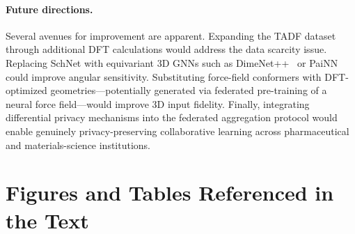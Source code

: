 \documentclass[twocolumn]{article}
\begin{document}
\paragraph{Future directions.}
Several avenues for improvement are apparent.
Expanding the TADF dataset through additional DFT calculations would address the data scarcity issue.
Replacing SchNet with equivariant 3D GNNs such as DimeNet++~\cite{Gasteiger2020_DimeNet} or PaiNN~\cite{Schutt2021_PaiNN} could improve angular sensitivity.
Substituting force-field conformers with DFT-optimized geometries---potentially generated via federated pre-training of a neural force field---would improve 3D input fidelity.
Finally, integrating differential privacy mechanisms into the federated aggregation protocol would enable genuinely privacy-preserving collaborative learning across pharmaceutical and materials-science institutions.








\clearpage
\appendix
\section*{Figures and Tables Referenced in the Text}
\end{document}
